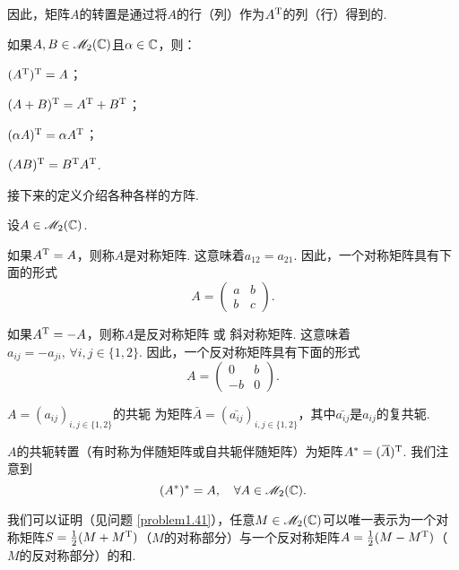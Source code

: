   因此，矩阵$A$的转置是通过将$A$的行（列）作为$A^{\mathrm T}$的列（行）得到的.

  \begin{property}
    如果$A,B\in\mathscr M_2(\mathbb C)$且$\alpha\in \mathbb C$，则：
    \begin{enum}
      \item $(A^{\mathrm T})^{\mathrm T}=A$；
      \item $(A+B)^{\mathrm T}=A^{\mathrm T}+B^{\mathrm T}$；
      \item $(\alpha A)^{\mathrm T}=\alpha A^{\mathrm T}$；
      \item $(AB)^{\mathrm T}=B^{\mathrm T} A^{\mathrm T}$.
    \end{enum}
  \end{property}

  接下来的定义介绍各种各样的方阵.
  \begin{definition}
    设$A\in \mathscr M_2(\mathbb C)$.
    \begin{enum}
      \item 如果$A^{\mathrm T}=A$，则称$A$是{\kaishu 对称矩阵}. 这意味着$a_{12}=a_{21}$. 因此，一个对称矩阵具有下面的形式
          \[
            A = \begin{pmatrix}
              a & b \\
              b & c
            \end{pmatrix}.
          \]
      \item 如果$A^{\mathrm T}=-A$，则称$A$是{\kaishu 反对称矩阵}  或  {\kaishu 斜对称矩阵}. 这意味着$a_{ij}=-a_{ji},\,\forall i,j\in\{1,2\}$. 因此，一个反对称矩阵具有下面的形式
          \[
            A = \begin{pmatrix}
              0 & b \\
              -b & 0
            \end{pmatrix}.
          \]
      \item $A=(a_{ij})_{i,j\in\{1,2\}}$的{\kaishu 共轭} 为矩阵$\bar A=(\bar{a_{ij}})_{i,j\in\{1,2\}}$，其中$\bar{a_{ij}}$是$a_{ij}$的复共轭.
      \item $A$的{\kaishu 共轭转置}（有时称为{\kaishu 伴随矩阵}或{\kaishu 自共轭伴随矩阵}）为矩阵$A^\ast=({}\mkern2mu\overline{\mkern-2muA})^{\mathrm T}$. 我们注意到
          \[
            (A^\ast)^\ast = A,\quad \forall A\in\mathscr M_2(\mathbb C).
          \]
    \end{enum}
  \end{definition}

  \begin{remark}
    我们可以证明（见问题 \ref{problem1.41}），任意$M\in\mathscr M_2(\mathbb C)$可以唯一表示为一个对称矩阵$S=\frac12(M+M^{\mathrm T})$（$M$的对称部分）与一个反对称矩阵$A=\frac12(M-M^{\mathrm T})$（$M$的反对称部分）的和.
  \end{remark}

